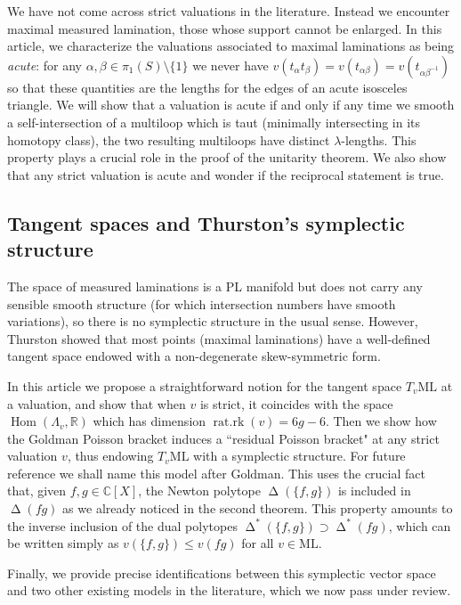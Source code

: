 \documentclass{amsart}
\newcommand{\C}{\mathbb{C}}
\newcommand{\R}{\mathbb{R}}
\newcommand{\ML}{\mathrm{ML}}
\DeclareMathOperator{\Hom}{Hom}
\DeclareMathOperator{\ratrk}{\mathrm{rat.rk}}
\DeclareMathOperator{\NewSet}{\Delta}
\begin{document}
We have not come across strict valuations in the literature. Instead we encounter maximal measured lamination, those whose support cannot be enlarged. In this article, we characterize the valuations associated to maximal laminations as being \emph{acute}: for any $\alpha,\beta\in \pi_1(S)\setminus\{1\}$ we never have $v(t_\alpha t_\beta)=v(t_{\alpha\beta})=v(t_{\alpha\beta^{-1}})$ so that these quantities are the lengths for the edges of an acute isosceles triangle. 
We will show that a valuation is acute if and only if any time we smooth a self-intersection of a multiloop which is taut (minimally intersecting in its homotopy class), the two resulting multiloops have distinct $\lambda$-lengths. This property plays a crucial role in the proof of the unitarity theorem. We also show that any strict valuation is acute and wonder if the reciprocal statement is true. 



\subsection*{Tangent spaces and Thurston's symplectic structure}

The space of measured laminations is a PL manifold but does not carry any sensible smooth structure (for which intersection numbers have smooth variations), so there is no symplectic structure in the usual sense. However, Thurston showed that most points (maximal laminations) have a well-defined tangent space endowed with a non-degenerate skew-symmetric form. 

In this article we propose a straightforward notion for the tangent space $T_v\ML$ at a valuation, and show that when $v$ is strict, it coincides with the space $\Hom(\Lambda_v,\R)$ which has dimension $\ratrk(v)=6g-6$. 
%
Then we show how the Goldman Poisson bracket induces a ``residual Poisson bracket" at any strict valuation $v$, thus endowing $T_v\ML$ with a symplectic structure. For future reference we shall name this model after Goldman.
%
This uses the crucial fact that, given $f,g\in \C[X]$, the Newton polytope $\NewSet(\{f,g\})$ is included in $\NewSet(fg)$ as we already noticed in the second theorem. This property amounts to the inverse inclusion of the dual polytopes $\NewSet^*(\{f,g\}) \supset \NewSet^*(fg)$, which can be written simply as $v(\{f,g\})\le v(fg)$ for all $v\in \ML$.

Finally, we provide precise identifications between this symplectic vector space and two other existing models in the literature, which we now pass under review.
\end{document}
